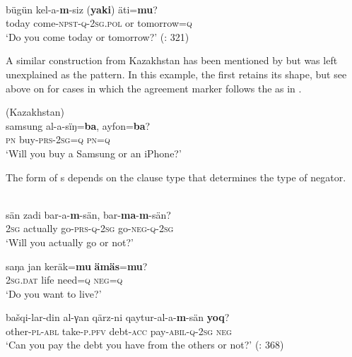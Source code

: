 \ea%
    \label{ex:turk:30}
    \\
    \gll bügün    kel-a-\textbf{{m}}-siz      (\textbf{{yaki}})  äti=\textbf{{mu}}?\\
    today    come-\textsc{npst}-\textsc{q}-2\textsc{sg.pol}    or  tomorrow=\textsc{q}\\
    \glt ‘Do you come today or tomorrow?’ (\citealt{TuohutiLitifu2012}: 321)
    \z

A similar construction from Kazakhstan has been mentioned by \citet[18]{Muhamedowa2016} but was left unexplained as the  pattern. In this example, the first  retains its shape, but see above on  for cases in which the agreement marker follows the  as in .

\ea%
    \label{ex:turk:31}
     (Kazakhstan)\\
    \gll samsung  al-a-sïŋ=\textbf{{ba}},    ayfon=\textbf{{ba}}?\\
    \textsc{pn}    buy-\textsc{prs}-2\textsc{sg}=\textsc{q}  \textsc{pn}=\textsc{q}\\
    \glt ‘Will you buy a Samsung or an iPhone?’ \citep[18]{Muhamedowa2016}
    \z

The form of s depends on the clause type that determines the type of negator.

\ea%
    \label{ex:turk:32}
    \\
    \ea
    \gll sän  zadi    bar-a-\textbf{{m}}-sän,  bar-\textbf{{ma}}-\textbf{{m}}{-sän?}\\
    2\textsc{sg}  actually  go-\textsc{prs}-\textsc{q}-2\textsc{sg}  go-\textsc{neg}-\textsc{q}-2\textsc{sg}\\
    \glt ‘Will you actually go or not?’
    
    \ex
    \gll saŋa    jan  keräk=\textbf{{mu}} \textbf{{ämäs}}{=}\textbf{{mu}}?\\
    2\textsc{sg}.\textsc{dat} life  need=\textsc{q}  \textsc{neg}=\textsc{q}\\
    \glt ‘Do you want to live?’
    
    \ex
    \gll bašqi-lar-din  al-γan    qärz-ni    qaytur-al-a-\textbf{{m}}{-sän} \textbf{{yoq}}?\\
    other-\textsc{pl}-\textsc{abl}  take-\textsc{p.pfv}  debt-\textsc{acc}  pay-\textsc{abil}-\textsc{q}-2\textsc{sg}  \textsc{neg}\\
    \glt ‘Can you pay the debt you have from the others or not?’ (\citealt{TuohutiLitifu2012}: 368)\z\z

